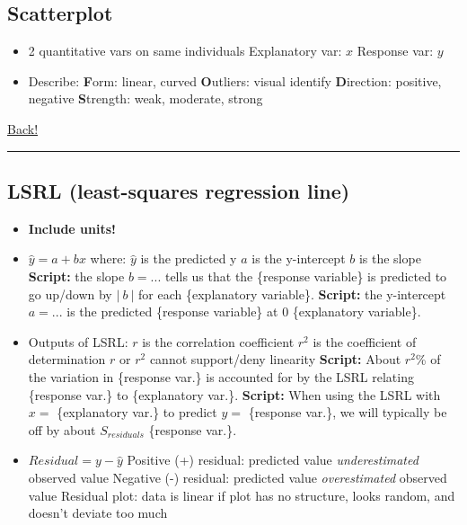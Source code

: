 \documentclass[main]{subfiles}
\begin{document}
\subsection{Scatterplot}
\begin{itemize}
    \item 2 quantitative vars on same individuals
        \subitem Explanatory var: $x$
        \subitem Response var: $y$
    \item Describe:
        \subitem \textbf{F}orm: linear, curved
        \subitem \textbf{O}utliers: visual identify
        \subitem \textbf{D}irection: positive, negative
        \subitem \textbf{S}trength: weak, moderate, strong
\end{itemize}

\noindent\hyperlink{toc}{Back!}
\newline\hrule

\subsection{LSRL (least-squares regression line)}
\begin{itemize}
    \item \textbf{Include units!}
    \item $\hat{y} = a + bx$ where:
        \subitem $\hat{y}$ is the predicted y
        \subitem $a$ is the y-intercept
        \subitem $b$ is the slope
        \subitem \textbf{Script:} the slope $b = ...$ tells us that the \{response variable\} is predicted to go up/down by $|\:b\:|$ for each \{explanatory variable\}.
        \subitem \textbf{Script:} the y-intercept $a = ...$ is the predicted \{response variable\} at 0 \{explanatory variable\}.
    \item Outputs of LSRL:
        \subitem $r$ is the correlation coefficient
        \subitem $r^2$ is the coefficient of determination
        \subsubitem $r$ or $r^2$ cannot support/deny linearity
        \subitem \textbf{Script:} About $r^2$\% of the variation in \{response var.\} is accounted for by the LSRL relating \{response var.\} to \{explanatory var.\}.
        \subitem \textbf{Script:} When using the LSRL with $x = $ \{explanatory var.\} to predict $y = $ \{response var.\}, we will typically be off by about $S_{residuals}$ \{response var.\}.
    \item $Residual = y - \hat{y}$
        \subitem Positive (+) residual: predicted value \textit{underestimated} observed value
        \subitem Negative (-) residual: predicted value \textit{overestimated} observed value
        \subitem Residual plot: data is linear if plot has no structure, looks random, and doesn't deviate too much
\end{itemize}
\end{document}
